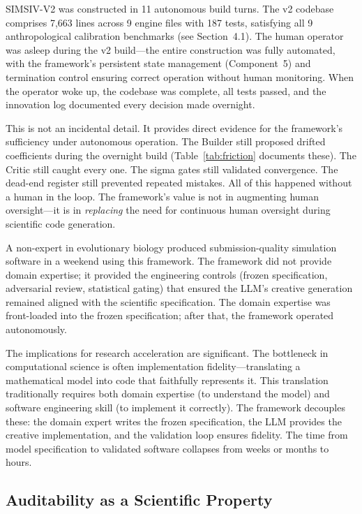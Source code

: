 \documentclass[11pt,a4paper]{article}
\begin{document}
SIMSIV-V2 was constructed in 11 autonomous build turns. The v2 codebase comprises 7,663 lines across 9 engine files with 187 tests, satisfying all 9 anthropological calibration benchmarks (see Section~4.1). The human operator was asleep during the v2 build---the entire construction was fully automated, with the framework's persistent state management (Component~5) and termination control ensuring correct operation without human monitoring. When the operator woke up, the codebase was complete, all tests passed, and the innovation log documented every decision made overnight.

This is not an incidental detail. It provides direct evidence for the framework's sufficiency under autonomous operation. The Builder still proposed drifted coefficients during the overnight build (Table~\ref{tab:friction} documents these). The Critic still caught every one. The sigma gates still validated convergence. The dead-end register still prevented repeated mistakes. All of this happened without a human in the loop. The framework's value is not in augmenting human oversight---it is in \textit{replacing} the need for continuous human oversight during scientific code generation.

A non-expert in evolutionary biology produced submission-quality simulation software in a weekend using this framework. The framework did not provide domain expertise; it provided the engineering controls (frozen specification, adversarial review, statistical gating) that ensured the LLM's creative generation remained aligned with the scientific specification. The domain expertise was front-loaded into the frozen specification; after that, the framework operated autonomously.

The implications for research acceleration are significant. The bottleneck in computational science is often implementation fidelity---translating a mathematical model into code that faithfully represents it. This translation traditionally requires both domain expertise (to understand the model) and software engineering skill (to implement it correctly). The framework decouples these: the domain expert writes the frozen specification, the LLM provides the creative implementation, and the validation loop ensures fidelity. The time from model specification to validated software collapses from weeks or months to hours.

\subsection{Auditability as a Scientific Property}
\end{document}
